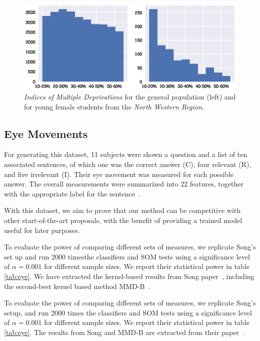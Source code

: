 \begin{figure}[htbp]
    \centering
    \includegraphics[width=\textwidth]{images/6_som/imd_histogram.eps}
    \caption[Histogram of the \gls{IMD} for two populations]{
        \emph{Indices of Multiple Deprivations} for the general population (left) and for
        young female students from the \emph{North Western Region}.
    }
    \label{fig:oulad_hist}
\end{figure}

\subsection{Eye Movements}
\label{subsec:som_eye}
For generating this dataset, 11 subjects were shown a question and a list of ten 
associated sentences, of which one was the correct answer (C), four relevant (R), and five
irrelevant (I). Their eye movement was measured for each possible answer.
The overall measurements were summarized into 22 features, together with the
appropriate label for the sentence~\cite{salojarvi2005inferring}.

With this dataset, we aim to prove that our method can be competitive with other
start-of-the-art proposals, with the benefit of providing a trained model useful for
later purposes.

To evaluate the power of comparing different sets of measures, we replicate Song's
set up and run 2000 times\footnotemark the classifiers and \gls{SOM}  tests using a significance
level of $\alpha = 0.001$ for different sample sizes.
We report their statistical power in table \ref{tab:eye}. We have extracted the kernel-based
results from Song \etal paper~\cite{song2021fast}, including the second-best kernel
based method MMD-B~\cite{zaremba2013b}.

To evaluate the power of comparing different sets of measures, we replicate
Song's setup, and run 2000 times the classifiers and \gls{SOM}  tests
using a significance level of $\alpha = 0.001$ for different sample sizes.
We report their statistical power in table \ref{tab:eye}. The results from Song and
MMD-B are extracted from their paper~\cite{song2021fast}.

